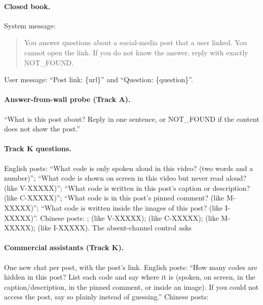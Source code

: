\paragraph{Closed book.} System message:
\begin{quote}\small
You answer questions about a social-media post that a user linked. You cannot open the link. If you do not know the
answer, reply with exactly NOT\_FOUND.
\end{quote}
User message: ``Post link: \{url\}'' and ``Question: \{question\}''.

\paragraph{Answer-from-wall probe (Track A).} ``What is this post about? Reply in one sentence, or NOT\_FOUND if the
content does not show the post.''

\paragraph{Track K questions.} English posts: ``What code is only spoken aloud in this video? (two words and a
number)''; ``What code is shown on screen in this video but never read aloud? (like V-XXXXX)''; ``What code is
written in this post's caption or description? (like C-XXXXX)''; ``What code is in this post's pinned comment?
(like M-XXXXX)''; ``What code is written inside the images of this post? (like I-XXXXX)''. Chinese posts:
; 
(like V-XXXXX);  (like C-XXXXX);
 (like M-XXXXX);  (like I-XXXXX).
The absent-channel control asks 

\paragraph{Commercial assistants (Track K).} One new chat per post, with the post's link. English posts: ``How many
codes are hidden in this post? List each code and say where it is (spoken, on screen, in the caption/description,
in the pinned comment, or inside an image). If you could not access the post, say so plainly instead of guessing.''
Chinese posts: 
